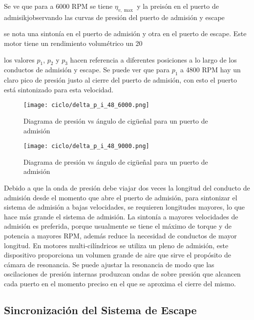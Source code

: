 Se ve que para a 6000 RPM se tiene $\eta_{v,\max}$ y la preisón en el puerto de admisikjobservando las curvas de
presión del puerto de admisión y escape


se nota una sintonía en el puerto de
admisión y otra en el puerto de escape. Este motor tiene un rendimiento
volumétrico un 20%


los valores $p_1$, $p_2$ y $p_3$ hacen referencia a diferentes posiciones a lo
largo de los conductos de admisión y escape.
%
Se puede ver que para $p_1$ a 4800 RPM hay un claro pico de presión justo al
cierre del puerto de admisión, con esto el puerto está sintonizado para esta
velocidad.

\begin{figure} \centering
\texttt{[image: ciclo/delta\_p\_i\_48\_6000.png]}
    \caption{Diagrama de presión vs ángulo de cigüeñal para un puerto de admisión}\label{fig:sintonia_adm}
\end{figure}
%
\begin{figure} \centering
\texttt{[image: ciclo/delta\_p\_i\_48\_9000.png]}
    \caption{Diagrama de presión vs ángulo de cigüeñal para un puerto de admisión}\label{fig:no_sintonia_adm}
\end{figure}

Debido a que la onda de presión debe viajar dos veces la longitud del conducto de
admisión desde el momento que abre el puerto de admisión, para sintonizar el
sistema de admisión a bajas velocidades, se requieren longitudes mayores, lo que
hace más grande el sistema de admisión.
%
La sintonía a mayores velocidades de admisión es preferida, porque usualmente
se tiene el máximo de torque y de potencia a mayores RPM, además reduce la
necesidad de conductos de mayor longitud.
%
En motores multi-cilíndricos se utiliza un pleno de admisión, este dispositivo
proporciona un volumen grande de aire que sirve el propósito de cámara de
resonancia.
%
Se puede ajustar la resonancia de modo que las oscilaciones de presión internas
produzcan ondas de sobre presión que alcancen cada puerto en el momento preciso
en el que se aproxima el cierre del mismo.


\subsection{Sincronización del Sistema de Escape}

